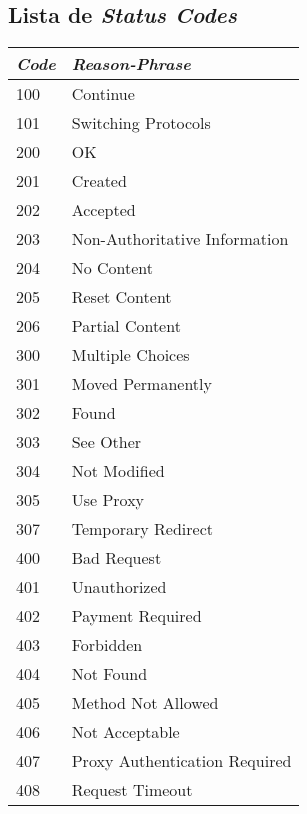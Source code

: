 \begin{anexosenv}
\partanexos
\chapter{Lista de \textit{Status Codes}}
\label{anexo:status}
\begin{table}[H]
    \centering
    \begin{tabular}{|l|l|}
    \hline
    \textit{Code} & \textit{Reason-Phrase}                 \\
    \hline
    100  & Continue                      \\
    101  & Switching Protocols           \\
    200  & OK                            \\
    201  & Created                       \\
    202  & Accepted                      \\
    203  & Non-Authoritative Information \\
    204  & No Content                    \\
    205  & Reset Content                 \\
    206  & Partial Content               \\
    300  & Multiple Choices              \\
    301  & Moved Permanently             \\
    302  & Found                         \\
    303  & See Other                     \\
    304  & Not Modified                  \\
    305  & Use Proxy                     \\
    307  & Temporary Redirect            \\
    400  & Bad Request                   \\
    401  & Unauthorized                  \\
    402  & Payment Required              \\
    403  & Forbidden                     \\
    404  & Not Found                     \\
    405  & Method Not Allowed            \\
    406  & Not Acceptable                \\
    407  & Proxy Authentication Required \\
    408  & Request Timeout               \\

\end{tabular}
\end{table}
\end{anexosenv}
